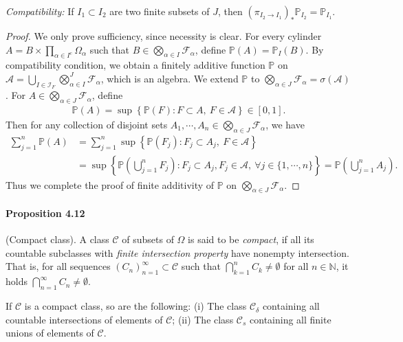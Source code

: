 \documentclass{article}
\numberwithin{equation}{section}
\renewcommand{\P}{\mathbb{P}}
\theoremstyle{plain}
\theoremstyle{definition}
\begin{document}
\textit{Compatibility:} If $I_1\subset I_2$ are two finite subsets of $J$, then $(\pi_{I_2\to I_1})_*\P_{I_2}=\P_{I_1}$.
\begin{proof}
We only prove sufficiency, since necessity is clear. For every cylinder $A=B\times\prod_{\alpha\in I^c}\Omega_\alpha$ such that $B\in\bigotimes_{\alpha\in I}\mathscr{F}_\alpha$, define $\P(A)=\P_I(B)$. By compatibility condition, we obtain a finitely additive function $\P$ on $\mathscr{A}=\bigcup_{I\in\mathcal{I}_F}\bigotimes_{\alpha\in I}^J\mathscr{F}_\alpha$, which is an algebra. We extend $\P$ to $\bigotimes_{\alpha\in J}\mathscr{F}_\alpha=\sigma(\mathscr{A})$. For $A\in\bigotimes_{\alpha\in J}\mathscr{F}_\alpha$, define
\begin{align*}
	\P(A)=\sup\left\{\P(F):F\subset A,\ F\in\mathscr{A}\right\}\in[0,1].
\end{align*}
Then for any collection of disjoint sets $A_1,\cdots,A_n\in\bigotimes_{\alpha\in J}\mathscr{F}_\alpha$, we have
\begin{align*}
	\sum_{j=1}^n\P(A)&=\sum_{j=1}^n\sup\left\{\P(F_j):F_j\subset A_j,\ F\in\mathscr{A}\right\}\\
	&= \sup\left\{\P\left(\bigcup_{j=1}^n F_j\right):F_j\subset A_j,F_j\in\mathscr{A},\ \forall j\in\{1,\cdots,n\}\right\} = \P\left(\bigcup_{j=1}^n A_j\right).
\end{align*}
Thus we complete the proof of finite additivity of $\P$ on $\bigotimes_{\alpha\in J}\mathscr{F}_\alpha$. 
\end{proof}

\paragraph{Proposition 4.12\label{prop:4.12}} (Compact class). A class $\mathscr{C}$ of subsets of $\Omega$ is said to be \textit{compact}, if all its countable subclasses with \textit{finite intersection property} have nonempty intersection. That is, for all sequences $(C_n)_{n=1}^\infty\subset\mathscr{C}$ such that $\bigcap_{k=1}^n C_k\neq\emptyset$ for all $n\in\mathbb{N}$, it holds $\bigcap_{n=1}^\infty C_n\neq\emptyset$.

If $\mathscr{C}$ is a compact class, so are the following: (i) The class $\mathscr{C}_\delta$ containing all countable intersections of elements of $\mathscr{C}$; (ii) The class $\mathscr{C}_s$ containing all finite unions of elements of $\mathscr{C}$.
\end{document}
